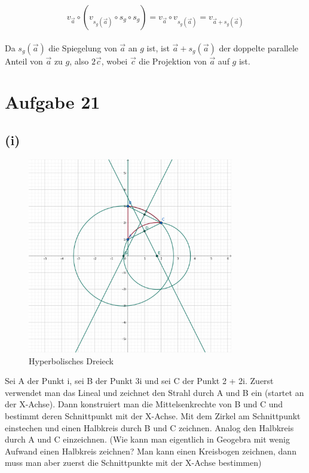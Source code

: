 \documentclass[12pt,a4paper]{article}
\begin{document}
\[
v_{\vec{a}} \circ (v_{s_g(\vec{a})} \circ s_g \circ s_g) = v_{\vec{a}} \circ v_{s_g(\vec{a})}
= v_{\vec{a} + s_g(\vec{a})}
\]
\\
Da $s_g(\vec{a})$ die Spiegelung von $\vec{a}$ an $g$ ist, ist $\vec{a} + s_g(\vec{a})$ der doppelte parallele Anteil von $\vec{a}$ zu $g$, also $2\vec{c}$, wobei $\vec{c}$ die Projektion von $\vec{a}$ auf $g$ ist.

\newpage
\section*{Aufgabe 21}
\subsection*{(i)}
\begin{figure}[htbp]
    \centering
    \includegraphics[width=0.8\textwidth]{Blatt07_Aufgabe_21}
    \caption{Hyperbolisches Dreieck}
    \label{fig:Aufgabe_21}
\end{figure}

\noindent Sei A der Punkt i, sei B der Punkt 3i und sei C der Punkt 2 + 2i. Zuerst verwendet man das Lineal und zeichnet den Strahl durch A und B ein (startet an der X-Achse). Dann konstruiert man die Mittelsenkrechte von B und C und bestimmt deren Schnittpunkt mit der X-Achse. Mit dem Zirkel am Schnittpunkt einstechen und einen Halbkreis durch B und C zeichnen. Analog den Halbkreis durch A und C einzeichnen. (Wie kann man eigentlich in Geogebra mit wenig Aufwand einen Halbkreis zeichnen? Man kann einen Kreisbogen zeichnen, dann muss man aber zuerst die Schnittpunkte mit der X-Achse bestimmen)
\end{document}
